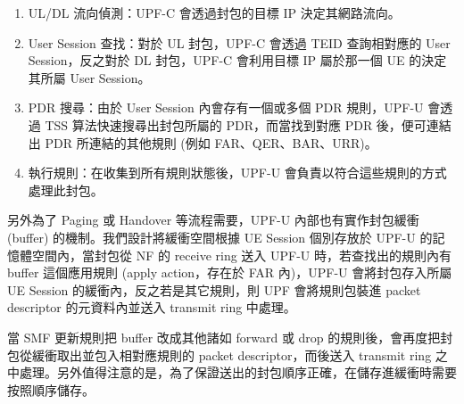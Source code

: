 \begin{enumerate}
\item UL/DL 流向偵測：UPF-C 會透過封包的目標 IP 決定其網路流向。
\item User Session 查找：對於 UL 封包，UPF-C 會透過 TEID 查詢相對應的 User Session，反之對於 DL 封包，UPF-C 會利用目標 IP 屬於那一個 UE 的決定其所屬 User Session。
\item PDR 搜尋：由於 User Session 內會存有一個或多個 PDR 規則，UPF-U 會透過 TSS 算法快速搜尋出封包所屬的 PDR，而當找到對應 PDR 後，便可連結出 PDR 所連結的其他規則 (例如 FAR、QER、BAR、URR)。
\item 執行規則：在收集到所有規則狀態後，UPF-U 會負責以符合這些規則的方式處理此封包。
\end{enumerate}

另外為了 Paging 或 Handover 等流程需要，UPF-U 內部也有實作封包緩衝 (buffer) 的機制。我們設計將緩衝空間根據 UE Session 個別存放於 UPF-U 的記憶體空間內，當封包從 NF 的 receive ring 送入 UPF-U 時，若查找出的規則內有 buffer 這個應用規則 (apply action，存在於 FAR 內)，UPF-U 會將封包存入所屬 UE Session 的緩衝內，反之若是其它規則，則 UPF 會將規則包裝進 packet descriptor 的元資料內並送入 transmit ring 中處理。

當 SMF 更新規則把 buffer 改成其他諸如 forward 或 drop 的規則後，會再度把封包從緩衝取出並包入相對應規則的 packet descriptor，而後送入 transmit ring 之中處理。另外值得注意的是，為了保證送出的封包順序正確，在儲存進緩衝時需要按照順序儲存。
